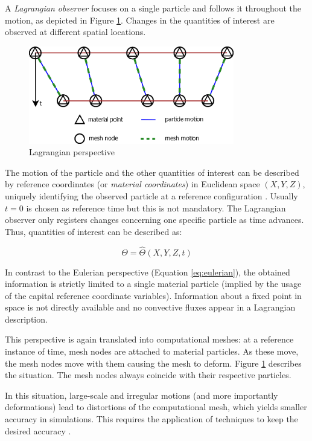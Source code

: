 A \textit{Lagrangian observer} focuses on a single particle and follows it throughout the motion, as depicted in Figure \ref{fig:lagrangian}. Changes in the quantities of interest are observed at different spatial locations. 

\begin{figure}[htbp!]
	\centering
	\includegraphics[width=0.8\textwidth]{images/lagrangian}
	\caption{Lagrangian perspective}
	\label{fig:lagrangian}
\end{figure}

The motion of the particle and the other quantities of interest can be described by reference coordinates (or \textit{material coordinates}) in Euclidean space $(X, Y, Z)$, uniquely identifying the observed particle at a reference configuration \cite{XING201957}. Usually $t = 0$ is chosen as reference time but this is not mandatory. The Lagrangian observer only registers changes concerning one specific particle as time advances. Thus, quantities of interest can be described as:

\begin{equation}
	\Theta = \hat{\Theta}(X, Y, Z, t)
\end{equation}

In contrast to the Eulerian perspective (Equation \ref{eq:eulerian}), the obtained information is strictly limited to a single material particle (implied by the usage of the capital reference coordinate variables). 
Information about a fixed point in space is not directly available and no convective fluxes appear in a Lagrangian description.

This perspective is again translated into computational meshes: at a reference instance of time, mesh nodes are attached to material particles. As these move, the mesh nodes move with them causing the mesh to deform. Figure \ref{fig:lagrangian} describes the situation. The mesh nodes always coincide with their respective particles.

In this situation, large-scale and irregular motions (and more importantly deformations) lead to distortions of the computational mesh, which yields smaller accuracy in simulations. This requires the application of techniques to keep the desired accuracy \cite{lipton2010robustness}.

